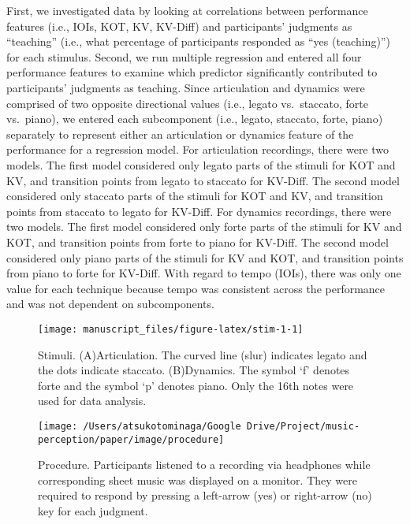 \documentclass[
  man,floatsintext]{apa6}
\begin{document}
First, we investigated data by looking at correlations between performance features (i.e., IOIs, KOT, KV, KV-Diff) and participants' judgments as ``teaching'' (i.e., what percentage of participants responded as ``yes (teaching)'') for each stimulus. Second, we run multiple regression and entered all four performance features to examine which predictor significantly contributed to participants' judgments as teaching. Since articulation and dynamics were comprised of two opposite directional values (i.e., legato vs.~staccato, forte vs.~piano), we entered each subcomponent (i.e., legato, staccato, forte, piano) separately to represent either an articulation or dynamics feature of the performance for a regression model. For articulation recordings, there were two models. The first model considered only legato parts of the stimuli for KOT and KV, and transition points from legato to staccato for KV-Diff. The second model considered only staccato parts of the stimuli for KOT and KV, and transition points from staccato to legato for KV-Diff. For dynamics recordings, there were two models. The first model considered only forte parts of the stimuli for KV and KOT, and transition points from forte to piano for KV-Diff. The second model considered only piano parts of the stimuli for KV and KOT, and transition points from piano to forte for KV-Diff. With regard to tempo (IOIs), there was only one value for each technique because tempo was consistent across the performance and was not dependent on subcomponents.

\begin{figure}
\texttt{[image: manuscript\_files/figure-latex/stim-1-1]} \caption{\label{fig:stim1}Stimuli. (A)Articulation. The curved line (slur) indicates legato and the dots indicate staccato. (B)Dynamics. The symbol `f' denotes forte and the symbol `p' denotes piano. Only the 16th notes were used for data analysis.}\label{fig:stim-1}
\end{figure}

\begin{figure}
\texttt{[image: /Users/atsukotominaga/Google Drive/Project/music-perception/paper/image/procedure]} \caption{\label{fig:procedure1}Procedure. Participants listened to a recording via headphones while corresponding sheet music was displayed on a monitor. They were required to respond by pressing a left-arrow (yes) or right-arrow (no) key for each judgment.}\label{fig:procedure-1}
\end{figure}
\end{document}
